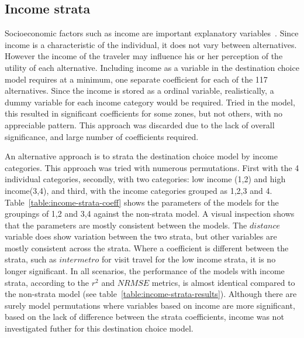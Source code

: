 \subsection{Income strata}
Socioeconomic factors such as income are important explanatory variables~\parencite{kitamura1997micro}. Since income is a characteristic of the individual, it does not vary between alternatives. However the income of the traveler may influence his or her perception of the utility of each alternative. Including income as a variable in the destination choice model requires at a minimum, one separate coefficient for each of the 117 alternatives. Since the income is stored as a ordinal variable, realistically, a dummy variable for each income category would be required. Tried in the model, this resulted in significant coefficients for some zones, but not others, with no appreciable pattern. This approach was discarded due to the lack of overall significance, and large number of coefficients required. 

An alternative approach is to strata the destination choice model by income categories. This approach was tried with numerous permutations. First with the 4 individual categories, secondly, with two categories: low income (1,2) and high income(3,4), and third, with the income categories grouped as {1,2,3} and {4}. Table~\ref{table:income-strata-coeff} shows the parameters of the models for the groupings of {1,2} and {3,4} against the non-strata model. A visual inspection shows that the parameters are mostly consistent between the models. The $distance$ variable does show variation between the two strata, but other variables are mostly consistent across the strata. Where a coefficient is different between the strata, such as $intermetro$ for visit travel for the low income strata, it is no longer significant. In all scenarios, the performance of the models with income strata, according to the $r^2$ and $NRMSE$ metrics, is almost identical compared to the non-strata model (see table~\ref{table:income-strata-results}). Although there are surely model permutations where variables based on income are more significant, based on the lack of difference between the strata coefficients, income was not investigated futher for this destination choice model. 


